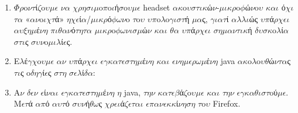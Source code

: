 \documentclass[a4paper,11pt,english]{sphinxmanual}
\begin{document}
\begin{description}
\begin{enumerate}
\item {} 
\(\Phi\)\(\rho\)o\(\nu\)\(\tau\)ί\(\zeta\)o\(\upsilon\)\(\mu\)\(\epsilon\) \(\nu\)\(\alpha\) \(\chi\)\(\rho\)\(\eta\)\(\sigma\)\(\iota\)\(\mu\)o\(\pi\)o\(\iota\)ή\(\sigma\)o\(\upsilon\)\(\mu\)\(\epsilon\) headset \(\alpha\)\(\kappa\)o\(\upsilon\)\(\sigma\)\(\tau\)\(\iota\)\(\kappa\)ώ\(\nu\)-\(\mu\)\(\iota\)\(\kappa\)\(\rho\)o\(\phi\)ώ\(\nu\)o\(\upsilon\) \(\kappa\)\(\alpha\)\(\iota\) ό\(\chi\)\(\iota\) \(\tau\)\(\alpha\) «\(\alpha\)\(\nu\)o\(\iota\)\(\chi\)\(\tau\)ά» \(\eta\)\(\chi\)\(\epsilon\)ί\(\alpha\)/\(\mu\)\(\iota\)\(\kappa\)\(\rho\)ό\(\phi\)\(\omega\)\(\nu\)o \(\tau\)o\(\upsilon\) \(\upsilon\)\(\pi\)o\(\lambda\)o\(\gamma\)\(\iota\)\(\sigma\)\(\tau\)ή \(\mu\)\(\alpha\)ς, \(\gamma\)\(\iota\)\(\alpha\)\(\tau\)ί \(\alpha\)\(\lambda\)\(\lambda\)\(\iota\)ώς \(\upsilon\)\(\pi\)ά\(\rho\)\(\chi\)\(\epsilon\)\(\iota\) \(\alpha\)\(\upsilon\)\(\xi\)\(\eta\)\(\mu\)έ\(\nu\)\(\eta\) \(\pi\)\(\iota\)\(\theta\)\(\alpha\)\(\nu\)ό\(\tau\)\(\eta\)\(\tau\)\(\alpha\) \(\mu\)\(\iota\)\(\kappa\)\(\rho\)o\(\phi\)\(\omega\)\(\nu\)\(\iota\)\(\sigma\)\(\mu\)ώ\(\nu\) \(\kappa\)\(\alpha\)\(\iota\) \(\theta\)\(\alpha\) \(\upsilon\)\(\pi\)ά\(\rho\)\(\chi\)\(\epsilon\)\(\iota\) \(\sigma\)\(\eta\)\(\mu\)\(\alpha\)\(\nu\)\(\tau\)\(\iota\)\(\kappa\)ή \(\delta\)\(\upsilon\)\(\sigma\)\(\kappa\)o\(\lambda\)ί\(\alpha\) \(\sigma\)\(\tau\)\(\iota\)ς \(\sigma\)\(\upsilon\)\(\nu\)o\(\mu\)\(\iota\)\(\lambda\)ί\(\epsilon\)ς.

\item {} 
E\(\lambda\)έ\(\gamma\)\(\chi\)o\(\upsilon\)\(\mu\)\(\epsilon\) \(\alpha\)\(\nu\) \(\upsilon\)\(\pi\)ά\(\rho\)\(\chi\)\(\epsilon\)\(\iota\) \(\epsilon\)\(\gamma\)\(\kappa\)\(\alpha\)\(\tau\)\(\epsilon\)\(\sigma\)\(\tau\)\(\eta\)\(\mu\)έ\(\nu\)\(\eta\) \(\kappa\)\(\alpha\)\(\iota\) \(\epsilon\)\(\nu\)\(\eta\)\(\mu\)\(\epsilon\)\(\rho\)\(\omega\)\(\mu\)έ\(\nu\)\(\eta\) java \(\alpha\)\(\kappa\)o\(\lambda\)o\(\upsilon\)\(\theta\)ώ\(\nu\)\(\tau\)\(\alpha\)ς \(\tau\)\(\iota\)ς o\(\delta\)\(\eta\)\(\gamma\)ί\(\epsilon\)ς \(\sigma\)\(\tau\)\(\eta\) \(\sigma\)\(\epsilon\)\(\lambda\)ί\(\delta\)\(\alpha\): 

\item {} 
A\(\nu\) \(\delta\)\(\epsilon\)\(\nu\) \(\epsilon\)ί\(\nu\)\(\alpha\)\(\iota\) \(\epsilon\)\(\gamma\)\(\kappa\)\(\alpha\)\(\tau\)\(\epsilon\)\(\sigma\)\(\tau\)\(\eta\)\(\mu\)έ\(\nu\)\(\eta\) \(\eta\) java, \(\tau\)\(\eta\)\(\nu\) \(\kappa\)\(\alpha\)\(\tau\)\(\epsilon\)\(\beta\)ά\(\zeta\)o\(\upsilon\)\(\mu\)\(\epsilon\) \(\kappa\)\(\alpha\)\(\iota\) \(\tau\)\(\eta\)\(\nu\) \(\epsilon\)\(\gamma\)\(\kappa\)\(\alpha\)\(\theta\)\(\iota\)\(\sigma\)\(\tau\)oύ\(\mu\)\(\epsilon\). M\(\epsilon\)\(\tau\)ά \(\alpha\)\(\pi\)ό \(\alpha\)\(\upsilon\)\(\tau\)ό \(\sigma\)\(\upsilon\)\(\nu\)ή\(\theta\)\(\omega\)ς \(\chi\)\(\rho\)\(\epsilon\)\(\iota\)ά\(\zeta\)\(\epsilon\)\(\tau\)\(\alpha\)\(\iota\) \(\epsilon\)\(\pi\)\(\alpha\)\(\nu\)\(\epsilon\)\(\kappa\)\(\kappa\)ί\(\nu\)\(\eta\)\(\sigma\)\(\eta\) \(\tau\)o\(\upsilon\) Firefox.


\end{enumerate}
\end{description}
\end{document}
